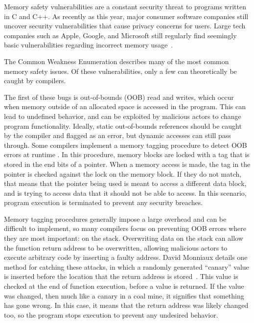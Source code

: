 \documentclass[sigconf, anonymous]{acmart}
\begin{document}
Memory safety vulnerabilities are a constant security threat to programs written in C and C++. As recently as this year, major consumer software companies still uncover security vulnerabilities that cause privacy concerns for users. Large tech companies such as Apple, Google, and Microsoft still regularly find seemingly basic vulnerabilities regarding incorrect memory usage~\cite{AppleSecurity}.

The Common Weakness Enumeration \cite{CWE:2023} describes many of the most common memory safety issues. Of these vulnerabilities, only a few can theoretically be caught by compilers.

The first of these bugs is out-of-bounds (OOB) read and writes, which occur when memory outside of an allocated space is accessed in the program. This can lead to undefined behavior, and can be exploited by malicious actors to change program functionality. Ideally, static out-of-bounds references should be caught by the compiler and flagged as an error, but dynamic accesses can still pass through. Some compilers implement a memory tagging procedure to detect OOB errors at runtime \cite{Chen:HeMate}. In this procedure, memory blocks are locked with a tag that is stored in the end bits of a pointer. When a memory access is made, the tag in the pointer is checked against the lock on the memory block. If they do not match, that means that the pointer being used is meant to access a different data block, and is trying to access data that it should not be able to access. In this scenario, program execution is terminated to prevent any security breaches. 

Memory tagging procedures generally impose a large overhead and can be difficult to implement, so many compilers focus on preventing OOB errors where they are most important: on the stack. Overwriting data on the stack can allow the function return address to be overwritten, allowing malicious actors to execute arbitrary code by inserting a faulty address. David Monniaux details one method for catching these attacks, in which a randomly generated “canary” value is inserted before the location that the return address is stored~\cite{Monniaux:Memory}. This value is checked at the end of function execution, before a value is returned. If the value was changed, then much like a canary in a coal mine, it signifies that something has gone wrong. In this case, it means that the return address was likely changed too, so the program stops execution to prevent any undesired behavior.
\end{document}

